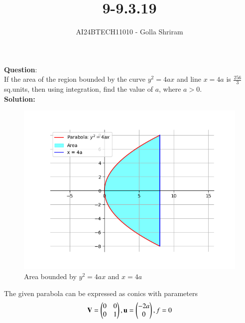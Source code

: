 \documentclass[journal]{IEEEtran}
\begin{document}

\vspace{3cm}

\title{9-9.3.19 }
\author{AI24BTECH11010  - Golla Shriram
}
{\let\newpage\relax\maketitle}

\renewcommand{\thefigure}{\theenumi}
\renewcommand{\thetable}{\theenumi}
\setlength{\intextsep}{10pt} %


\renewcommand{\thetable}{\theenumi}


\textbf{Question}:\\If the area of the region bounded by the curve $y^{2}=4ax$ and line  $x = 4a$  is $\frac{256} {3}$  sq.units, then using integration, find the value of $a$, where $a>0$.
     \\
\textbf{Solution: }\\

  \begin{figure}[h!]
   \centering
   \includegraphics[width=0.6\linewidth]{figs/Figure_1.png}
	  \caption{ Area bounded by $y^2 =  4ax$ and $x=4a$ }
   \label{stemplot}
\end{figure}

The given parabola can be expressed as conics with parameters\\
\begin{align}
	\mathbf{V}=\begin{pmatrix}
		0 & 0
   \\
	0 & 1
 \end{pmatrix}, \mathbf{u} = \begin{pmatrix} -2a  \\
0 \end{pmatrix} , f =0 
 \end{align}
 
\end{document}
